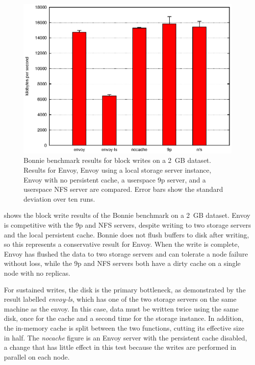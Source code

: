 \begin{figure}[t]
\centering
\includegraphics[width=\figwidth]{figures/bonnie-druid1-write}
\caption[Bonnie benchmark results for block writes]{Bonnie benchmark results for block writes on a 2~GB dataset. Results for Envoy, Envoy using a local storage server instance, Envoy with no persistent cache, a userspace 9p server, and a userspace NFS server are compared. Error bars show the standard deviation over ten runs.}
\label{fig:bonnie-druid1-write}
\end{figure}

 shows the block write results of the Bonnie benchmark on a 2~GB dataset. Envoy is competitive with the 9p and NFS servers, despite writing to two storage servers and the local persistent cache. Bonnie does not flush buffers to disk after writing, so this represents a conservative result for Envoy. When the write is complete, Envoy has flushed the data to two storage servers and can tolerate a node failure without loss, while the 9p and NFS servers both have a dirty cache on a single node with no replicas.

For sustained writes, the disk is the primary bottleneck, as demonstrated by the result labelled \emph{envoy-ls}, which has one of the two storage servers on the same machine as the envoy. In this case, data must be written twice using the same disk, once for the cache and a second time for the storage instance. In addition, the in-memory cache is split between the two functions, cutting its effective size in half. The \emph{nocache} figure is an Envoy server with the persistent cache disabled, a change that has little effect in this test because the writes are performed in parallel on each node.

